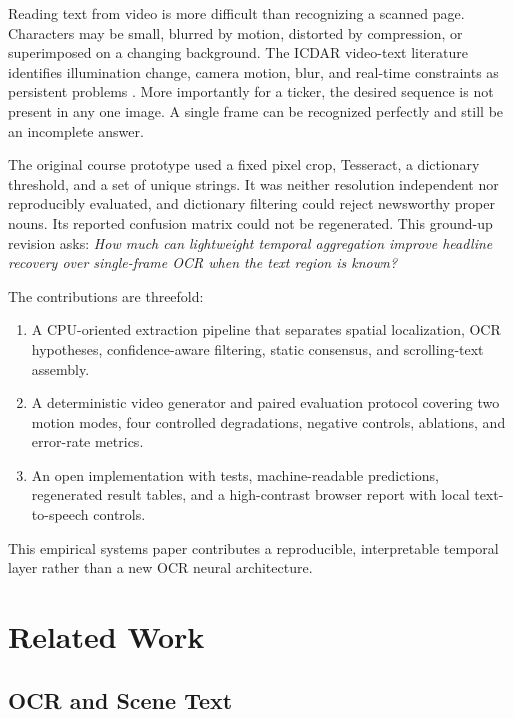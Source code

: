 \documentclass[conference]{IEEEtran}
\begin{document}
Reading text from video is more difficult than recognizing a scanned page.  Characters may be
small, blurred by motion, distorted by compression, or superimposed on a changing background.
The ICDAR video-text literature identifies illumination change, camera motion, blur, and
real-time constraints as persistent problems \cite{karatzas2013icdar,cheng2021svts}.  More
importantly for a ticker, the desired sequence is not present in any one image.  A single frame
can be recognized perfectly and still be an incomplete answer.

The original course prototype used a fixed pixel crop, Tesseract, a dictionary threshold, and a
set of unique strings.  It was neither resolution independent nor reproducibly evaluated, and
dictionary filtering could reject newsworthy proper nouns.  Its reported confusion matrix could
not be regenerated.  This ground-up revision asks: \emph{How much can lightweight temporal
aggregation improve headline recovery over single-frame OCR when the text region is known?}

The contributions are threefold:
\begin{enumerate}
    \item A CPU-oriented extraction pipeline that separates spatial localization, OCR
    hypotheses, confidence-aware filtering, static consensus, and scrolling-text assembly.
    \item A deterministic video generator and paired evaluation protocol covering two motion
    modes, four controlled degradations, negative controls, ablations, and error-rate metrics.
    \item An open implementation with tests, machine-readable predictions, regenerated result
    tables, and a high-contrast browser report with local text-to-speech controls.
\end{enumerate}

This empirical systems paper contributes a reproducible, interpretable temporal layer rather
than a new OCR neural architecture.

\section{Related Work}

\subsection{OCR and Scene Text}
\end{document}
